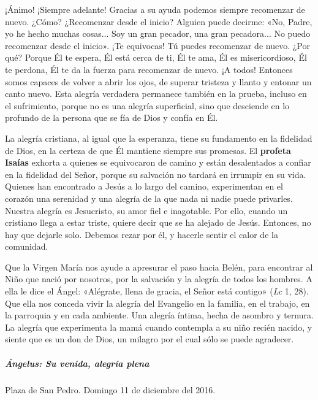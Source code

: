 \documentclass[]{article}
\let\oldsubparagraph\subparagraph
\renewcommand{\subparagraph}[1]{\oldsubparagraph{#1}\mbox{}}
\begin{document}
¡Ánimo! ¡Siempre adelante! Gracias a su ayuda podemos siempre recomenzar
de nuevo. ¿Cómo? ¿Recomenzar desde el inicio? Alguien puede decirme:
«No, Padre, yo he hecho muchas cosas... Soy un gran pecador, una gran
pecadora... No puedo recomenzar desde el inicio». ¡Te equivocas! Tú
puedes recomenzar de nuevo. ¿Por qué? Porque Él te espera, Él está cerca
de ti, Él te ama, Él es misericordioso, Él te perdona, Él te da la
fuerza para recomenzar de nuevo. ¡A todos! Entonces somos capaces de
volver a abrir los ojos, de superar tristeza y llanto y entonar un canto
nuevo. Esta alegría verdadera permanece también en la prueba, incluso en
el sufrimiento, porque no es una alegría superficial, sino que desciende
en lo profundo de la persona que se fía de Dios y confía en Él.

La alegría cristiana, al igual que la esperanza, tiene su fundamento en
la fidelidad de Dios, en la certeza de que Él mantiene siempre sus
promesas. El \textbf{profeta Isaías} exhorta a quienes se equivocaron de
camino y están desalentados a confiar en la fidelidad del Señor, porque
su salvación no tardará en irrumpir en su vida. Quienes han encontrado a
Jesús a lo largo del camino, experimentan en el corazón una serenidad y
una alegría de la que nada ni nadie puede privarles. Nuestra alegría es
Jesucristo, su amor fiel e inagotable. Por ello, cuando un cristiano
llega a estar triste, quiere decir que se ha alejado de Jesús. Entonces,
no hay que dejarle solo. Debemos rezar por él, y hacerle sentir el calor
de la comunidad.

Que la Virgen María nos ayude a apresurar el paso hacia Belén, para
encontrar al Niño que nació por nosotros, por la salvación y la alegría
de todos los hombres. A ella le dice el Ángel: «Alégrate, llena de
gracia, el Señor está contigo» (\emph{Lc} 1, 28). Que ella nos conceda
vivir la alegría del Evangelio en la familia, en el trabajo, en la
parroquia y en cada ambiente. Una alegría íntima, hecha de asombro y
ternura. La alegría que experimenta la mamá cuando contempla a su niño
recién nacido, y siente que es un don de Dios, un milagro por el cual
sólo se puede agradecer.

\subparagraph{Ángelus: Su venida, alegría
plena}\label{uxe1ngelus-su-venida-alegruxeda-plena}

Plaza de San Pedro.  Domingo 11 de diciembre del 2016.
\end{document}
